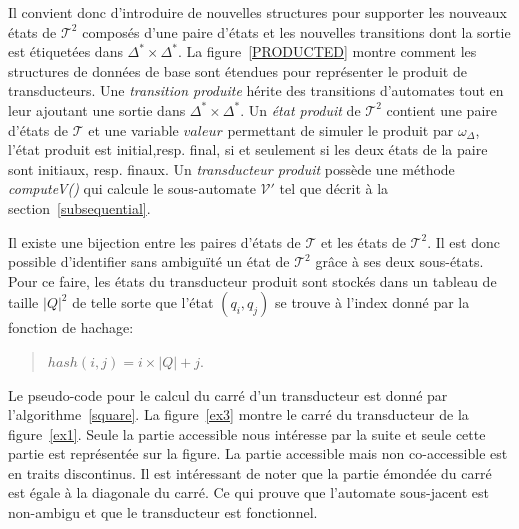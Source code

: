 	Il convient donc d'introduire de nouvelles structures pour supporter les nouveaux états de $\mathscr{T}^2$ composés d'une paire d'états et les nouvelles transitions dont la sortie est étiquetées dans $\Delta^* \times \Delta^*$. La figure~\ref{PRODUCTED} montre comment les structures de données de base sont étendues pour représenter le produit de transducteurs. Une \emph{transition produite} hérite des transitions d'automates tout en leur ajoutant une sortie dans $\Delta^* \times \Delta^*$. Un \emph{état produit} de $\mathscr{T}^2$ contient une paire d'états de $\mathscr{T}$ et une variable $valeur$ permettant de simuler le produit par $\omega_\Delta$, l'état produit est initial,resp. final, si et seulement si les deux états de la paire sont initiaux, resp. finaux. Un \emph{transducteur produit} possède une méthode \emph{computeV()} qui calcule le sous-automate $\mathscr{V'}$ tel que décrit à la section~\ref{subsequential}.
	
	Il existe une bijection entre les paires d'états de $\mathscr{T}$ et les états de $\mathscr{T}^2$. Il est donc possible d'identifier sans ambiguïté un état de $\mathscr{T}^2$ grâce à ses deux sous-états. Pour ce faire, les états du transducteur produit sont stockés dans un tableau de taille $|Q|^2$ de telle sorte que l'état $(q_i,q_j)$ se trouve à l'index donné par la fonction de hachage:
	\begin{quotation}
		$hash(i, j) = i \times |Q| + j$. \\
	\end{quotation}
	
	Le pseudo-code pour le calcul du carré d'un transducteur est donné par l'algorithme~\ref{square}. La figure~\ref{ex3} montre le carré du transducteur de la figure~\ref{ex1}. Seule la partie accessible nous intéresse par la suite et seule cette partie est représentée sur la figure. La partie accessible mais non co-accessible est en traits discontinus. Il est intéressant de noter que la partie émondée du carré est égale à la diagonale du carré. Ce qui prouve que l'automate sous-jacent est non-ambigu et que le transducteur est fonctionnel.
	
	
	
	

